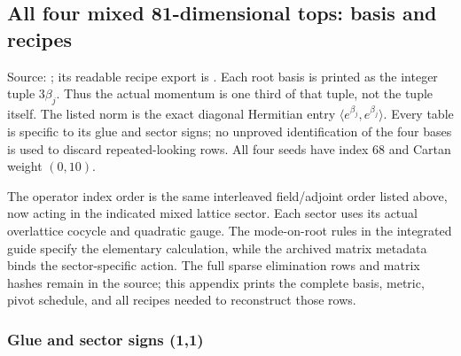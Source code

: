 \subsection{All four mixed 81-dimensional tops: basis and recipes}
\label{expdata:81-tops}
Source: ; its readable
recipe export is .
Each root basis is printed as the integer tuple $3\beta_j$. Thus the
actual momentum is one third of that tuple, not the tuple itself.
The listed norm is the exact diagonal Hermitian entry
$\langle e^{\beta_j},e^{\beta_j}\rangle$. Every table is specific to its
glue and sector signs; no unproved identification of the four bases is
used to discard repeated-looking rows. All four seeds have index 68 and
Cartan weight $(0,10)$.

The operator index order is the same interleaved field/adjoint order
listed above, now acting in the indicated mixed lattice sector. Each
sector uses its actual overlattice cocycle and quadratic gauge. The
mode-on-root rules in the integrated guide specify the elementary
calculation, while the archived matrix metadata binds the sector-specific
action. The full sparse elimination rows and matrix hashes remain in
the source; this appendix prints the complete basis, metric, pivot
schedule, and all recipes needed to reconstruct those rows.
\subsubsection{Glue and sector signs (1,1)}


